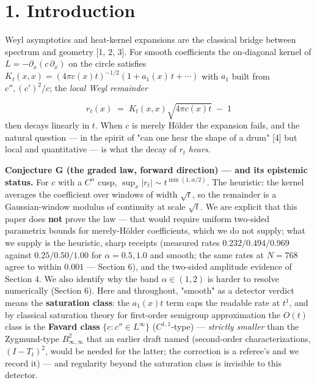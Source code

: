 \documentclass[11pt]{article}
\begin{document}
\section*{1. Introduction}
Weyl asymptotics and heat-kernel expansions are the classical bridge between spectrum and geometry [1, 2, 3].  For smooth coefficients the on-diagonal kernel of $L = -\partial_x(c\,\partial_x)$ on the circle satisfies $K_t(x,x) = (4\pi c(x)t)^{-1/2}(1 + a_1(x)\,t + \cdots)$ with $a_1$ built from $c'', (c')^2/c$; the \emph{local Weyl remainder}

\[
r_t(x) \;=\; K_t(x,x)\sqrt{4\pi c(x)t} \;-\; 1
\]
then decays linearly in $t$.  When $c$ is merely Hölder the expansion fails, and the natural question — in the spirit of "can one hear the shape of a drum" [4] but local and quantitative — is what the decay of $r_t$ \emph{hears}.

\textbf{Conjecture G (the graded law, forward direction) — and its epistemic status.}  For $c$ with a $C^\alpha$ cusp, $\sup_x|r_t| \sim t^{\min(1, \alpha/2)}$.  The heuristic: the kernel averages the coefficient over windows of width $\sqrt t$, so the remainder is a Gaussian-window modulus of continuity at scale $\sqrt t$.  We are explicit that this paper does \textbf{not} prove the law — that would require uniform two-sided parametrix bounds for merely-Hölder coefficients, which we do not supply; what we supply is the heuristic, sharp receipts (measured rates $0.232/0.494/0.969$ against $0.25/0.50/1.00$ for $\alpha = 0.5, 1.0$ and smooth; the same rates at $N = 768$ agree to within $0.001$ — Section 6), and the two-sided amplitude evidence of Section 4.  We also identify why the band $\alpha \in (1,2)$ is harder to resolve numerically (Section 6).  Here and throughout, "smooth" as a detector verdict means the \textbf{saturation class}: the $a_1(x)t$ term caps the readable rate at $t^1$, and by classical saturation theory for first-order semigroup approximation the $O(t)$ class is the \textbf{Favard class} $\{c : c'' \in L^\infty\}$ ($C^{1,1}$-type) — \emph{strictly smaller} than the Zygmund-type $B^2_{\infty,\infty}$ that an earlier draft named (second-order characterizations, $(I - T_t)^2$, would be needed for the latter; the correction is a referee's and we record it) — and regularity beyond the saturation class is invisible to this detector.
\end{document}
